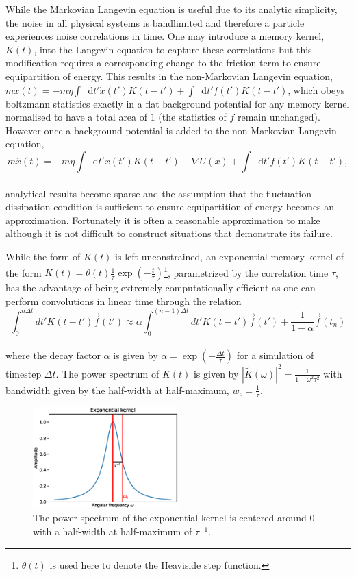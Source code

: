\documentclass{article}
\newcommand*{\diff}{\mathop{}\!\mathrm{d}}
\begin{document}
While the Markovian Langevin equation is useful due to its analytic simplicity, the noise in all physical systems is bandlimited and therefore a particle experiences noise correlations in time. One may introduce a memory kernel, $K(t)$, into the Langevin equation to capture these correlations but this modification requires a corresponding change to the friction term to ensure equipartition of energy. This results in the non-Markovian Langevin equation, $m\ddot{x}(t)=-m\eta\int\diff{t'}\dot{x}(t')K(t-t') + \int\diff{t'}f(t')K(t-t')$, which obeys boltzmann statistics exactly in a flat background potential for any memory kernel normalised to have a total area of $1$ (the statistics of $f$ remain unchanged). However once a background potential is added to the non-Markovian Langevin equation,
\\
\begin{equation}
	\label{eq:gle}
	m\ddot{x}(t)=-m\eta\int\diff{t'}\dot{x}(t')K(t-t') - \nabla U(x) + \int\diff{t'}f(t')K(t-t'),
\end{equation}
\\
analytical results become sparse and the assumption that the fluctuation dissipation condition is sufficient to ensure equipartition of energy becomes an approximation. Fortunately it is often a reasonable approximation to make although it is not difficult to construct situations that demonstrate its failure. 

While the form of $K(t)$ is left unconstrained, an exponential memory kernel of the form $K(t)=\theta(t)\frac{1}{\tau}\exp\left(-\frac{t}{\tau}\right)$\footnote{$\theta(t)$ is used here to denote the Heaviside step function.}, parametrized by the correlation time $\tau$, has the advantage of being extremely computationally efficient as one can perform convolutions in linear time through the relation
\\
$$
\int_0^{n\Delta{t}} dt' K\left(t-t'\right) \vec{f}(t') \approx \alpha \int_0^{(n-1)\Delta{t}} dt' K\left(t-t'\right) \vec{f}(t') + \frac{1}{1-\alpha} \vec{f}\left(t_n\right)
$$
\\
where the decay factor $\alpha$ is given by $\alpha=\exp(-\frac{\Delta{t}}{\tau})$ for a simulation of timestep $\Delta{t}$. The power spectrum of $K(t)$ is given by $\left|\tilde{K}(\omega)\right|^2 = \frac{1}{1+\omega^2\tau^2}$ with bandwidth given by the half-width at half-maximum, $w_c=\frac{1}{\tau}$.

\begin{figure}
	\centering
	\includegraphics[width=0.5\textwidth]{kernel_spectra}
	\caption{The power spectrum of the exponential kernel is centered around $0$ with a half-width at half-maximum of $\tau^{-1}$.}
	\label{fig:kernel_spectra}
\end{figure}
\end{document}
